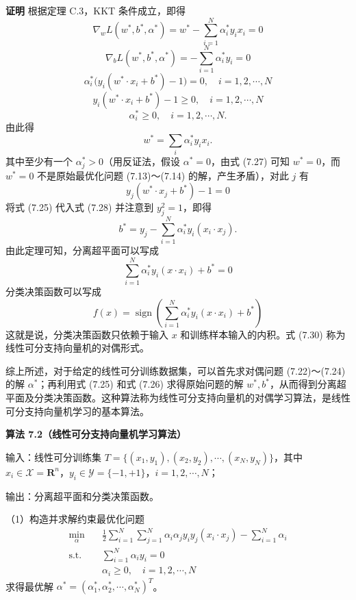 \documentclass[UTF8,12pt,a4paper,fontset=fandol]{ctexart}
\begin{document}
\noindent\textbf{证明}\quad
根据定理 C.3，KKT 条件成立，即得
\[
\nabla_w L(w^*,b^*,\alpha^*)=w^*-\sum_{i=1}^N\alpha_i^*y_i x_i=0
\]
\[
\nabla_b L(w^*,b^*,\alpha^*)=-\sum_{i=1}^N\alpha_i^*y_i=0
\]
\[
\alpha_i^*\bigl(y_i(w^*\cdot x_i+b^*)-1\bigr)=0,\quad i=1,2,\cdots,N
\]
\[
y_i(w^*\cdot x_i+b^*)-1\geq 0,\quad i=1,2,\cdots,N
\]
\[
\alpha_i^*\geq 0,\quad i=1,2,\cdots,N.
\]
由此得
\[
w^*=\sum_i\alpha_i^*y_i x_i.
\]
其中至少有一个 $\alpha_j^*>0$（用反证法，假设 $\alpha^*=0$，由式 (7.27) 可知 $w^*=0$，而 $w^*=0$ 不是原始最优化问题 (7.13)～(7.14) 的解，产生矛盾），对此 $j$ 有
\begin{equation}
y_j(w^*\cdot x_j+b^*)-1=0
\tag{7.28}
\end{equation}
将式 (7.25) 代入式 (7.28) 并注意到 $y_j^2=1$，即得
\[
b^*=y_j-\sum_{i=1}^N\alpha_i^*y_i(x_i\cdot x_j).
\]
由此定理可知，分离超平面可以写成
\begin{equation}
\sum_{i=1}^N\alpha_i^*y_i(x\cdot x_i)+b^*=0
\tag{7.29}
\end{equation}
分类决策函数可以写成
\begin{equation}
f(x)=\operatorname{sign}\left(\sum_{i=1}^N\alpha_i^*y_i(x\cdot x_i)+b^*\right)
\tag{7.30}
\end{equation}
这就是说，分类决策函数只依赖于输入 $x$ 和训练样本输入的内积。式 (7.30) 称为线性可分支持向量机的对偶形式。

综上所述，对于给定的线性可分训练数据集，可以首先求对偶问题 (7.22)～(7.24) 的解 $\alpha^*$；再利用式 (7.25) 和式 (7.26) 求得原始问题的解 $w^*,b^*$，从而得到分离超平面及分类决策函数。这种算法称为线性可分支持向量机的对偶学习算法，是线性可分支持向量机学习的基本算法。

\noindent\textbf{算法 7.2（线性可分支持向量机学习算法）}

输入：线性可分训练集 $T=\{(x_1,y_1),(x_2,y_2),\cdots,(x_N,y_N)\}$，其中 $x_i\in\mathcal{X}=\mathbf{R}^n$，$y_i\in\mathcal{Y}=\{-1,+1\}$，$i=1,2,\cdots,N$；

输出：分离超平面和分类决策函数。

（1）构造并求解约束最优化问题
\[
\begin{aligned}
\min_\alpha\quad & \frac{1}{2}\sum_{i=1}^N\sum_{j=1}^N\alpha_i\alpha_j y_i y_j(x_i\cdot x_j)-\sum_{i=1}^N\alpha_i\\
\mathrm{s.t.}\quad & \sum_{i=1}^N\alpha_i y_i=0\\
& \alpha_i\geq 0,\quad i=1,2,\cdots,N
\end{aligned}
\]
求得最优解 $\alpha^*=(\alpha_1^*,\alpha_2^*,\cdots,\alpha_N^*)^T$。
\end{document}
